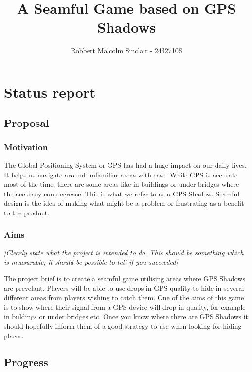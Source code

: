 \documentclass[11pt]{article}
\title{ A Seamful Game based on GPS Shadows }
\author{ Robbert Malcolm Sinclair - 2432710S }
\begin{document}
    \maketitle
    
    
     

\section{Status report}

\subsection{Proposal}\label{proposal}

\subsubsection{Motivation}\label{motivation}


The Global Positioning System or GPS has had a huge impact on our daily lives. It helps us navigate around unfamiliar areas with ease. While GPS is accurate most of the time, there
are some areas like in buildings or under bridges where the accuracy can decrease. This is what we refer to as a GPS Shadow. Seamful design is the idea of making what might be
a problem or frustrating as a benefit to the product. 


\subsubsection{Aims}\label{aims}

\emph{{[}Clearly state what the project is intended to do. This should
be something which is measurable; it should be possible to tell if you
succeeded{]}}

The project brief is to create a seamful game utilising areas where GPS Shadows are prevelant. Players will be able to use drops in GPS quality to hide in several different areas
from players wishing to catch them. One of the aims of this game is to show where their signal from a GPS device will drop in quality, for example in buldings or under bridges etc.
Once you know where there are GPS Shadows it should hopefully inform them of a good strategy to use when looking for hiding places.

\subsection{Progress}\label{progress}
\end{document}
